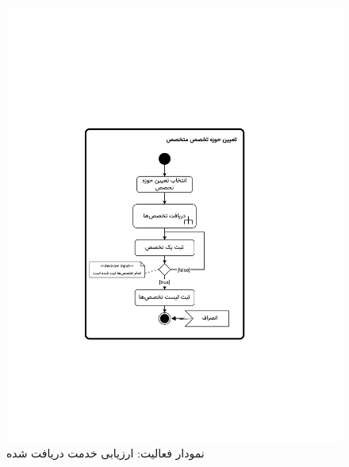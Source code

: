 \begin{figure}[ht!]
	\centering
	\includegraphics[scale=0.6, page=6]{figs/OOD-activity21-30.pdf}
	\caption{نمودار فعالیت: ارزیابی خدمت دریافت شده}
\end{figure}
\FloatBarrier
\newpage

